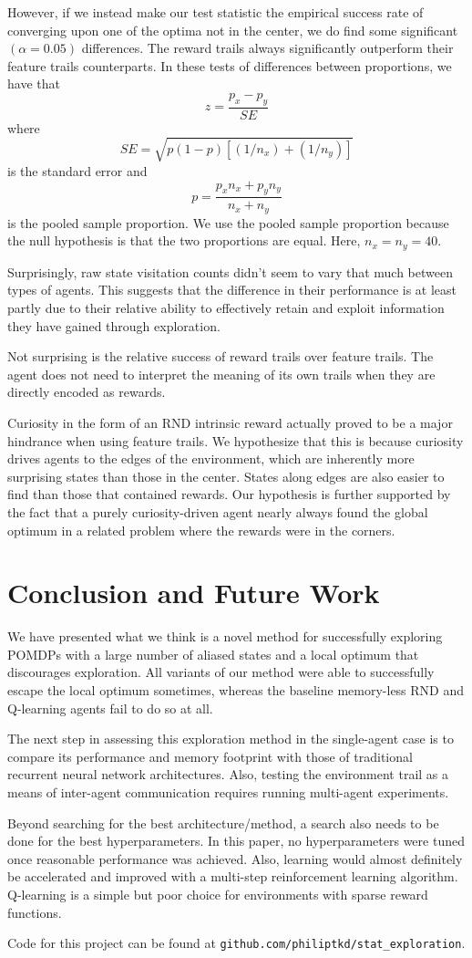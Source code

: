 \documentclass[12pt,journal,compsoc]{IEEEtran}
\begin{document}
	However, if we instead make our test statistic the empirical success rate of converging upon one of the optima not in the center, we do find some significant $(\alpha = 0.05)$ differences. The reward trails always significantly outperform their feature trails counterparts. In these tests of differences between proportions, we have that 
	\[z = \frac{p_x - p_y}{SE}\]
	where
	\[SE = \sqrt{p(1-p)[(1/n_x)+(1/n_y)]}\]
	is the standard error and
	\[p = \frac{p_xn_x+p_yn_y}{n_x+n_y}\]
	is the pooled sample proportion. We use the pooled sample proportion because the null hypothesis is that the two proportions are equal. Here, $n_x=n_y=40$.
	
	Surprisingly, raw state visitation counts didn't seem to vary that much between types of agents. This suggests that the difference in their performance is at least partly due to their relative ability to effectively retain and exploit information they have gained through exploration.
	
	Not surprising is the relative success of reward trails over feature trails. The agent does not need to interpret the meaning of its own trails when they are directly encoded as rewards.
	
	Curiosity in the form of an RND intrinsic reward actually proved to be a major hindrance when using feature trails. We hypothesize that this is because curiosity drives agents to the edges of the environment, which are inherently more surprising states than those in the center. States along edges are also easier to find than those that contained rewards. Our hypothesis is further supported by the fact that a purely curiosity-driven agent nearly always found the global optimum in a related problem where the rewards were in the corners.
	
	\section{Conclusion and Future Work}
	We have presented what we think is a novel method for successfully exploring POMDPs with a large number of aliased states and a local optimum that discourages exploration. All variants of our method were able to successfully escape the local optimum sometimes, whereas the baseline memory-less RND and Q-learning agents fail to do so at all.
	
	The next step in assessing this exploration method in the single-agent case is to compare its performance and memory footprint with those of traditional recurrent neural network architectures. Also, testing the environment trail as a means of inter-agent communication requires running multi-agent experiments.
	
	Beyond searching for the best architecture/method, a search also needs to be done for the best hyperparameters. In this paper, no hyperparameters were tuned once reasonable performance was achieved. Also, learning would almost definitely be accelerated and improved with a multi-step reinforcement learning algorithm. Q-learning is a simple but poor choice for environments with sparse reward functions. 
	
	Code for this project can be found at \texttt{github.com/philiptkd/stat\_exploration}.
	
	{}
		
	
\end{document}

